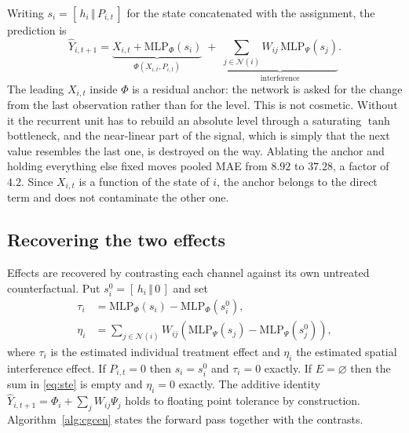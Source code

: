 \documentclass[journal]{IEEEtran}
\begin{document}
Writing $s_i = [\, h_i \,\Vert\, P_{i,t} \,]$ for the state concatenated with
the assignment, the prediction is
\begin{equation}
  \hat{Y}_{i,t+1}
  = \underbrace{X_{i,t} + \mathrm{MLP}_{\Phi}(s_i)}_{\Phi(X_{i,t}, P_{i,t})}
  \;+\; \underbrace{\sum_{j \in \mathcal{N}(i)} W_{ij} \,
    \mathrm{MLP}_{\Psi}(s_j)}_{\text{interference}} .
  \label{eq:decomposition}
\end{equation}
The leading $X_{i,t}$ inside $\Phi$ is a residual anchor: the network is asked
for the change from the last observation rather than for the level. This is not
cosmetic. Without it the recurrent unit has to rebuild an absolute level through
a saturating $\tanh$ bottleneck, and the near-linear part of the signal, which
is simply that the next value resembles the last one, is destroyed on the way.
Ablating the anchor and holding everything else fixed moves pooled MAE from
$8.92$ to $37.28$, a factor of $4.2$. Since $X_{i,t}$ is a function of the state
of $i$, the anchor belongs to the direct term and does not contaminate the other
one.

\subsection{Recovering the two effects}

Effects are recovered by contrasting each channel against its own untreated
counterfactual. Put $s_i^{0} = [\, h_i \,\Vert\, 0 \,]$ and set
\begin{align}
  \tau_i &= \mathrm{MLP}_{\Phi}(s_i) - \mathrm{MLP}_{\Phi}(s_i^{0}),
  \label{eq:ite}\\
  \eta_i &= \sum_{j \in \mathcal{N}(i)} W_{ij}
            \left( \mathrm{MLP}_{\Psi}(s_j) - \mathrm{MLP}_{\Psi}(s_j^{0}) \right),
  \label{eq:ste}
\end{align}
where $\tau_i$ is the estimated individual treatment effect and $\eta_i$ the
estimated spatial interference effect. If $P_{i,t}=0$ then $s_i = s_i^{0}$ and
$\tau_i = 0$ exactly. If $E = \varnothing$ then the sum in \eqref{eq:ste} is
empty and $\eta_i = 0$ exactly. The additive identity
$\hat{Y}_{i,t+1} = \Phi_i + \sum_j W_{ij}\Psi_j$ holds to floating point
tolerance by construction. Algorithm~\ref{alg:cgcen} states the forward pass
together with the contrasts.
\end{document}
